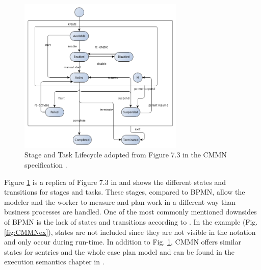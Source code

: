 \begin{figure}
  \centering
\includegraphics[width=0.7\textwidth]{../figures/chapter_indicators/CMMN_Stage_and_Task_Lifecycle_CMMN.png} 
\caption{Stage and Task Lifecycle adopted from Figure 7.3 in the CMMN specification \cite{CMMNspec2014}.}
  \label{fig:CMMNstates}
\end{figure}

Figure \ref{fig:CMMNstates} is a replica of Figure 7.3 in \cite{CMMNspec2014} and shows the different states and transitions for stages and tasks. These stages, compared to BPMN, allow the modeler and the worker to measure and plan work in a different way than business processes are handled. One of the most commonly mentioned downsides of BPMN is the lack of states and transitions according to \cite{Recker2010}. In the example (Fig. \ref{fig:CMMNex}), states are not included since they are not visible in the notation and only occur during run-time. In addition to Fig. \ref{fig:CMMNstates}, CMMN offers similar states for sentries and the whole case plan model and can be found in the execution semantics chapter in \cite{CMMNspec2014}. \\

